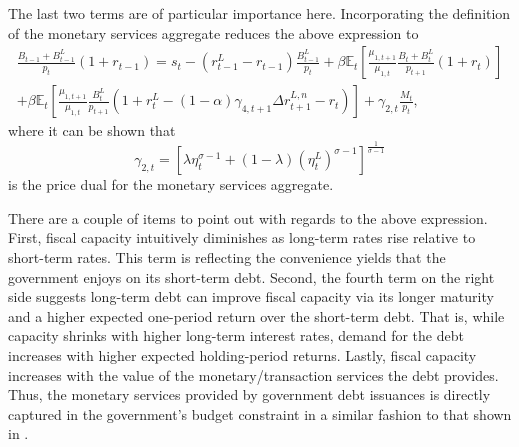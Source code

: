\documentclass[11pt,a4paper,margin=1.5in]{article}
\begin{document}
The last two terms are of particular importance here.
Incorporating the definition of the monetary services aggregate reduces the above expression to 
\begin{multline}
	\frac{B_{t-1} + B^L_{t-1}}{p_t}(1+r_{t-1})= s_t  - (r_{t-1}^L - r_{t-1})\frac{B^L_{t-1}}{p_t} + \beta\mathbb{E}_t\left[\frac{\mu_{1,t+1}}{\mu_{1,t}} \frac{B_{t} +B^L_{t}}{p_{t+1}}(1+r_{t})\right] \\ 
		+ \beta\mathbb{E}_t\left[\frac{\mu_{1,t+1}}{\mu_{1,t}} \frac{B^L_{t}}{p_{t+1}}(1+r^L_{t} - (1-\alpha)\gamma_{4,t+1}\Delta r^{L,n}_{t+1} - r_t)\right] 
		+  \gamma_{2,t}\frac{M_t}{p_t},
	\label{eq:fiscalcapacity}
\end{multline}
where it can be shown that
\begin{equation}
	\gamma_{2,t} = \left[\lambda \eta_t^{\sigma-1} + (1-\lambda)\left(\eta^L_t\right)^{\sigma-1}\right]^\frac{1}{\sigma-1}
	\label{eq:price_dual}
\end{equation}
is the price dual for the monetary services aggregate. 

There are a couple of items to point out with regards to the above expression.
First, fiscal capacity intuitively diminishes as long-term rates rise relative to short-term rates.
This term is reflecting the convenience yields that the government enjoys on its short-term debt.
Second, the fourth term on the right side suggests long-term debt can improve fiscal capacity via its longer maturity and a higher expected one-period return over the short-term debt. 
That is, while capacity shrinks with higher long-term interest rates, demand for the debt increases with higher expected holding-period returns. 
Lastly, fiscal capacity increases with the value of the monetary/transaction services the debt provides.
Thus, the monetary services provided by government debt issuances is directly captured in the government's budget constraint in a similar fashion to that shown in \citet{Brunnermeier-Merkel-Sannikov:2022}.
\end{document}
